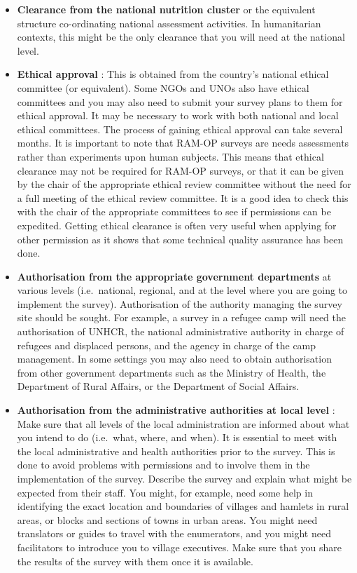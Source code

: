 \documentclass[12pt,a4paper]{book}
\begin{document}
\begin{itemize}
\item
  \textbf{Clearance from the national nutrition cluster} or the equivalent structure co-ordinating national assessment activities. In humanitarian contexts, this might be the only clearance that you will need at the national level.
\item
  \textbf{Ethical approval} : This is obtained from the country's national ethical committee (or equivalent). Some NGOs and UNOs also have ethical committees and you may also need to submit your survey plans to them for ethical approval. It may be necessary to work with both national and local ethical committees. The process of gaining ethical approval can take several months. It is important to note that RAM-OP surveys are needs assessments rather than experiments upon human subjects. This means that ethical clearance may not be required for RAM-OP surveys, or that it can be given by the chair of the appropriate ethical review committee without the need for a full meeting of the ethical review committee. It is a good idea to check this with the chair of the appropriate committees to see if permissions can be expedited. Getting ethical clearance is often very useful when applying for other permission as it shows that some technical quality assurance has been done.
\item
  \textbf{Authorisation from the appropriate government departments} at various levels (i.e.~national, regional, and at the level where you are going to implement the survey). Authorisation of the authority managing the survey site should be sought. For example, a survey in a refugee camp will need the authorisation of UNHCR, the national administrative authority in charge of refugees and displaced persons, and the agency in charge of the camp management. In some settings you may also need to obtain authorisation from other government departments such as the Ministry of Health, the Department of Rural Affairs, or the Department of Social Affairs.
\item
  \textbf{Authorisation from the administrative authorities at local level} : Make sure that all levels of the local administration are informed about what you intend to do (i.e.~what, where, and when). It is essential to meet with the local administrative and health authorities prior to the survey. This is done to avoid problems with permissions and to involve them in the implementation of the survey. Describe the survey and explain what might be expected from their staff. You might, for example, need some help in identifying the exact location and boundaries of villages and hamlets in rural areas, or blocks and sections of towns in urban areas. You might need translators or guides to travel with the enumerators, and you might need facilitators to introduce you to village executives. Make sure that you share the results of the survey with them once it is available.

\end{itemize}
\end{document}
